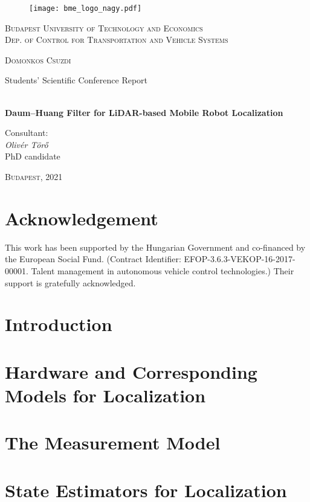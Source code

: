\documentclass[a4paper, 12pt]{paper}
\begin{document}
\begin{center}
	\begin{figure}[!h]
		\centering
		\texttt{[image: bme\_logo\_nagy.pdf]}
	\end{figure}
	\large\textsc{Budapest University of Technology and Economics\\
		Dep. of Control for Transportation
		and Vehicle Systems}
\end{center}
\thispagestyle{empty}
{\centering

	{\LARGE\textsc{Domonkos Csuzdi}

		\LARGE{Students' Scientific Conference Report}}

	{\Large\textbf{\\Daum--Huang Filter for LiDAR-based Mobile Robot Localization}}\\

	}

\begin{flushleft}
	\begin{minipage}{0.3\linewidth}
		\large{Consultant}:\\
		\forceindent \textit{Olivér Törő}\\
		\forceindent PhD candidate
	\end{minipage}
\end{flushleft}



\begin{center}
	{\Large\textsc{Budapest, }2021 }
\end{center}
\newpage
\thispagestyle{empty}
\newpage
\section*{Acknowledgement}
This work has been supported by the Hungarian Government and co-financed by the European Social Fund. (Contract Identifier: EFOP-3.6.3-VEKOP-16-2017-00001. Talent management in autonomous vehicle control technologies.) Their support is gratefully acknowledged.
\clearpage
\tableofcontents
\pagebreak
{}
\pagestyle{fancy}
\section{Introduction}

\section{Hardware and Corresponding Models for Localization}

\section{The Measurement Model}

\section{State Estimators for Localization}



\end{document}
